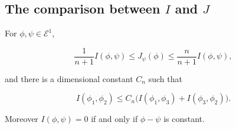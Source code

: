 \subsection{The comparison between \texorpdfstring{$I$}{I} and
\texorpdfstring{$J$}{J}}
\label{sec:ch47-comparison}

\begin{proposition}\label{prop:bj-energy-I-identities}
For $\phi,\psi\in\mathcal E^1$,

\[
 \frac1{n+1}I(\phi,\psi)\leq J_\psi(\phi)
       \leq\frac n{n+1}I(\phi,\psi),
\tag{47.7}\label{eq:bj-I-J-comparison}
\]

and there is a dimensional constant $C_n$ such that

\[
 I(\phi_1,\phi_2)
 \leq C_n\bigl(I(\phi_1,\phi_3)+I(\phi_3,\phi_2)\bigr).
\tag{47.8}\label{eq:bj-I-quasitriangle}
\]

Moreover $I(\phi,\psi)=0$ if and only if $\phi-\psi$ is constant.
\end{proposition}

